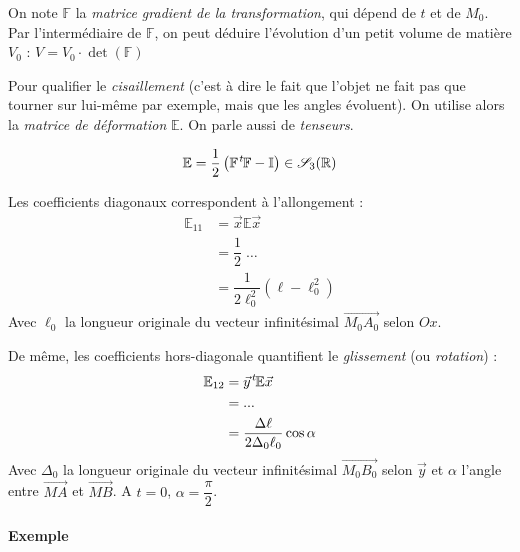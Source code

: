 \documentclass{article}
\newcommand{\transpose}{\hspace{.1em}{}^t\hspace{-.1em}}
\begin{document}
On note $\mathbb{F}$ la \emph{matrice gradient de la transformation}, qui dépend de $t$ et de $M_0$. 
Par l'intermédiaire de $\mathbb{F}$, on peut déduire l'évolution d'un petit volume de matière $V_0$ :  $V = V_0 \cdot \det (\mathbb{F})$

Pour qualifier le \emph{cisaillement} (c'est à dire le fait que l'objet ne fait pas que tourner sur lui-même par exemple, mais que les angles évoluent). On utilise alors la \emph{matrice de déformation} $\mathbb{E}$. On parle aussi de \emph{tenseurs}.

\[\mathbb{E} = \dfrac{1}{2} \left ( \mathbb{F} \transpose\mathbb{F} - \mathbb{I} \right ) \in \mathscr{S}_3(\mathbb{R})\]

Les coefficients diagonaux correspondent à l'allongement :
\begin{align*}
\mathbb{E}_{11} & = \vec{x}\mathbb{E}\vec{x}\\
& = \dfrac{1}{2} \; \hdots\\
& = \dfrac{1}{2\ell_0 ^2} \left ( \ell - \ell_0^2 \right )
\end{align*}
Avec $\ell_0$ la longueur originale du vecteur infinitésimal $\overrightarrow{M_0A_0}$ selon $Ox$.
\bigskip

De même, les coefficients hors-diagonale quantifient le \emph{glissement} (ou \emph{rotation}) :
\begin{align*}
\mathbb{E}_{12} & = \vec{y}\transpose \mathbb{E} \vec{x}\\
& = ... \\
& = \dfrac{\Delta \ell}{2 \Delta_0 \ell_0} \cos \alpha
\end{align*}
Avec $\Delta_0$ la longueur originale du vecteur infinitésimal $\overrightarrow{M_0B_0}$ selon $\vec{y}$ et $\alpha$ l'angle entre $\overrightarrow{MA}$ et $\overrightarrow{MB}$. A $t=0$, $\alpha = \dfrac{\pi}{2}$.

\paragraph{Exemple} 
\end{document}
